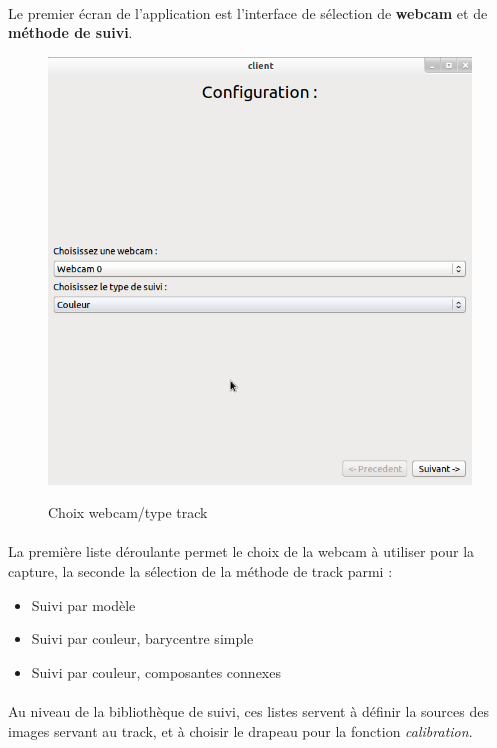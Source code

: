 \documentclass{report}
\begin{document}
				\paragraph{}
				Le premier écran de l'application est l'interface de sélection de \textbf{webcam} et de \textbf{méthode de suivi}.\\
				\begin{figure}[!h]
						\centering
						\includegraphics[scale=0.35]{../images/Capture6.png}\\
						\caption{Choix webcam/type track}
						\label{Choix webcam/type track}
				\end{figure}
				\paragraph{}
				La première liste déroulante permet le choix de la webcam à utiliser pour la capture, la seconde la sélection de la méthode de track parmi :
				\begin{itemize}
					\item Suivi par modèle
					\item Suivi par couleur, barycentre simple
					\item Suivi par couleur, composantes connexes
				\end{itemize}
				\paragraph{}
				Au niveau de la bibliothèque de suivi, ces listes servent à définir la sources des images servant au track, et à choisir le drapeau pour la fonction \textit{calibration}.
				\newpage
\end{document}
